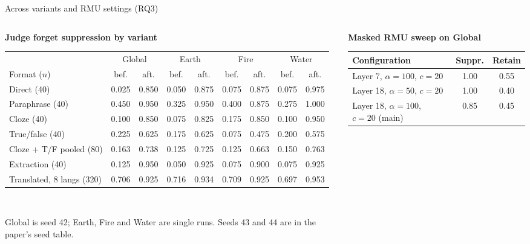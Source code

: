 \documentclass[aspectratio=169,11pt,usepdftitle=false]{beamer}
\begin{document}
\begin{frame}{Across variants and RMU settings (RQ3)}
\begin{columns}[T]
\begin{column}{0.55\textwidth}
\textbf{\small Judge forget suppression by variant}\\[3pt]
\tiny
\setlength{\tabcolsep}{2.2pt}
\begin{tabular}{@{}lcccccccc@{}}
\toprule
& \multicolumn{2}{c}{Global} & \multicolumn{2}{c}{Earth} & \multicolumn{2}{c}{Fire} & \multicolumn{2}{c}{Water}\\
\cmidrule(lr){2-3}\cmidrule(lr){4-5}\cmidrule(lr){6-7}\cmidrule(lr){8-9}
Format ($n$) & bef. & aft. & bef. & aft. & bef. & aft. & bef. & aft.\\
\midrule
Direct (40) & 0.025 & 0.850 & 0.050 & 0.875 & 0.075 & 0.875 & 0.075 & 0.975\\
Paraphrase (40) & 0.450 & 0.950 & 0.325 & 0.950 & 0.400 & 0.875 & 0.275 & 1.000\\
Cloze (40) & 0.100 & 0.850 & 0.075 & 0.825 & 0.175 & 0.850 & 0.100 & 0.950\\
True/false (40) & 0.225 & 0.625 & 0.175 & 0.625 & 0.075 & 0.475 & 0.200 & 0.575\\
Cloze + T/F pooled (80) & 0.163 & 0.738 & 0.125 & 0.725 & 0.125 & 0.663 & 0.150 & 0.763\\
Extraction (40) & 0.125 & 0.950 & 0.050 & 0.925 & 0.075 & 0.900 & 0.075 & 0.925\\
Translated, 8 langs (320) & 0.706 & 0.925 & 0.716 & 0.934 & 0.709 & 0.925 & 0.697 & 0.953\\
\bottomrule
\end{tabular}\\[3pt]
{\tiny Global is seed 42; Earth, Fire and Water are single runs. Seeds 43 and 44 are in the paper's seed table.\par}
\end{column}
\begin{column}{0.43\textwidth}
\textbf{\small Masked RMU sweep on Global}\\[3pt]
\tiny
\setlength{\tabcolsep}{3pt}
\begin{tabular}{@{}lcc@{}}
\toprule
Configuration & Suppr. & Retain\\
\midrule
Layer 7, $\alpha=100$, $c=20$ & 1.00 & 0.55\\
Layer 18, $\alpha=50$, $c=20$ & 1.00 & 0.40\\
Layer 18, $\alpha=100$, $c=20$ (main) & 0.85 & 0.45\\

\end{tabular}
\end{column}
\end{columns}
\end{frame}
\end{document}
